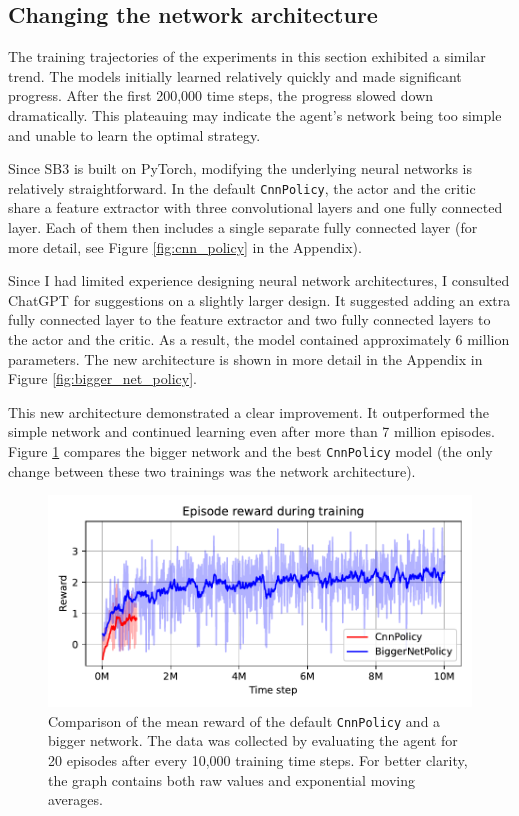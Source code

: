 \documentclass[
  digital,     %
  oneside,     %
  nosansbold,  %
  nocolorbold, %
  lof,         %
  lot,         %
]{fithesis4}
\begin{document}
\subsection{Changing the network architecture}
\label{subsec:arch_change}

The training trajectories of the experiments in this section exhibited a similar trend. The models initially learned relatively quickly and made significant progress. After the first 200,000 time steps, the progress slowed down dramatically. This plateauing may indicate the agent's network being too simple and unable to learn the optimal strategy.

Since SB3 is built on PyTorch, modifying the underlying neural networks is relatively straightforward. In the default \texttt{CnnPolicy}, the actor and the critic share a feature extractor with three convolutional layers and one fully connected layer. Each of them then includes a single separate fully connected layer (for more detail, see Figure \ref{fig:cnn_policy} in the Appendix).

Since I had limited experience designing neural network architectures, I consulted ChatGPT for suggestions on a slightly larger design. It suggested adding an extra fully connected layer to the feature extractor and two fully connected layers to the actor and the critic. As a result, the model contained approximately 6 million parameters. The new architecture is shown in more detail in the Appendix in Figure \ref{fig:bigger_net_policy}.

This new architecture demonstrated a clear improvement. It outperformed the simple network and continued learning even after more than 7 million episodes. Figure \ref{fig:v3_bigger_net} compares the bigger network and the best \texttt{CnnPolicy} model (the only change between these two trainings was the network architecture).

\begin{figure}
    \includegraphics[width=1\linewidth]{graphs/v3_cnn_vs_biggernet.pdf}
    \caption{Comparison of the mean reward of the default \texttt{CnnPolicy} and a bigger network. The data was collected by evaluating the agent for 20 episodes after every 10,000 training time steps. For better clarity, the graph contains both raw values and exponential moving averages.}
    \label{fig:v3_bigger_net}
\end{figure}
\end{document}
